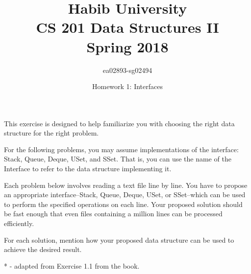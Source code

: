 \documentclass[addpoints]{exam}
\title{Habib University\\CS 201 Data Structures II\\Spring 2018}
\author{ea02893-sg02494}
\date{Homework 1: Interfaces}
\begin{document}
\maketitle

\begin{questions}


This exercise is designed to help familiarize you with choosing the right data structure for the right problem.

For the following problems, you may assume implementations of the interface: Stack, Queue, Deque, USet, and SSet. That is, you can use the name of the Interface to refer to the data structure implementing it.

Each problem below involves reading a text file line by line. You have to propose an appropriate interface--Stack, Queue, Deque, USet, or SSet--which can be used to perform the specified operations on each line. Your proposed solution should be fast enough that even files containing a million lines can be processed efficiently.

For each solution, mention how your proposed data structure can be used to achieve the desired result.

* - adapted from Exercise 1.1 from the book.

\end{questions}
\end{document}
